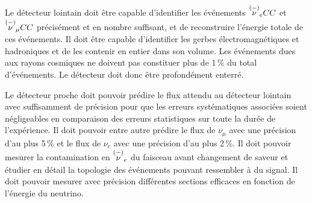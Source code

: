         Le détecteur lointain doit être capable d'identifier les événements $\overset{(-)}{\nu}_e CC$ et $\overset{(-)}{\nu}_{\mu} CC$ précisément et en nombre suffisant, et de reconstruire l'énergie totale de ces événements. Il doit être capable d'identifier les gerbes électromagnétiques et hadroniques et de les contenir en entier dans son volume. Les événements dues aux rayons cosmiques ne doivent pas constituer plus de 1\,\% du total d'événements. Le détecteur doit donc être profondément enterré.

        Le détecteur proche doit pouvoir prédire le flux attendu au détecteur lointain avec suffisamment de précision pour que les erreurs systématiques associées soient négligeables en comparaison des erreurs statistiques sur toute la durée de l'expérience. Il doit pouvoir entre autre prédire le flux de $\nu_{\mu}$ avec une précision d'au plus 5\,\% et le flux de $\nu_e$ avec une précision d'au plus 2\,\%. Il doit pouvoir mesurer la contamination en $\overset{(-)}{\nu}_e$ du faisceau avant changement de saveur et étudier en détail la topologie des événements pouvant ressembler à du signal. Il doit pouvoir mesurer avec précision différentes sections efficaces en fonction de l'énergie du neutrino.
        
